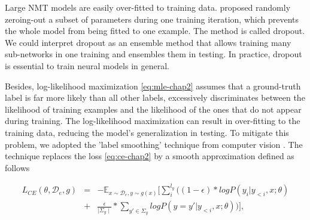 Large NMT models are easily over-fitted to training data. \citet{Srivastava14Dropout} proposed randomly zeroing-out a subset of parameters during one training iteration, which prevents the whole model from being fitted to one example. The method is called dropout. We could interpret dropout as an ensemble method that allows training many sub-networks in one training and ensembles them in testing. In practice, dropout is essential to train neural models in general. 

Besides, log-likelihood maximization \eqref{eq:mle-chap2} assumes that a ground-truth label is far more likely than all other labels, excessively discriminates between the likelihood of training examples and the likelihood of the ones that do not appear during training. The log-likelihood maximization can result in over-fitting to the training data, reducing the model's generalization in testing. To mitigate this problem, we adopted the 'label smoothing' technique from computer vision \citet{Szegedy16rethinking}. The technique replaces the loss \eqref{eq:ce-chap2} by a smooth approximation defined as follows

\begin{equation}
\begin{array}{rcl}
L_{CE}(\theta, \mathcal{D}_e, g) &=& -\displaystyle{ \mathbb{E}_{x \sim \mathcal{D}_e, y \sim g(x)}} \bigg[ \displaystyle{\mathop{\sum}_{i}^{l_y}} \big( (1-\epsilon) * log P(y_i|y_{<i},x;\theta) \\
	&+& \frac{\epsilon}{\mid \Sigma_y \mid} * \displaystyle{\mathop{\sum}_{y' \in \Sigma_y}} log P(y = y'|y_{<i},x;\theta)\big) \bigg], \\
\end{array}
\end{equation}

